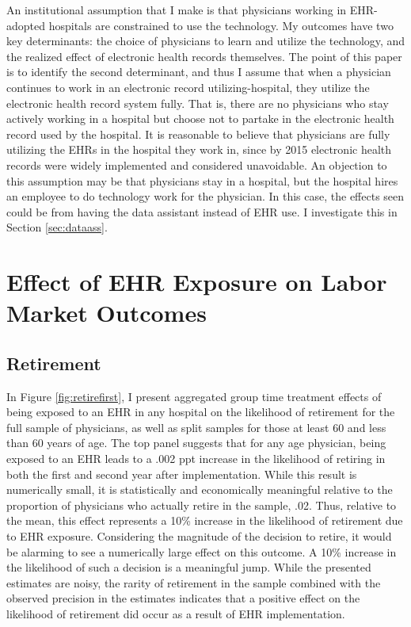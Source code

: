 \documentclass[11pt]{article}
\begin{document}
An institutional assumption that I make is that physicians working in EHR-adopted hospitals are constrained to use the technology. My outcomes have two key determinants: the choice of physicians to learn and utilize the technology, and the realized effect of electronic health records themselves. The point of this paper is to identify the second determinant, and thus I assume that when a physician continues to work in an electronic record utilizing-hospital, they utilize the electronic health record system fully. That is, there are no physicians who stay actively working in a hospital but choose not to partake in the electronic health record used by the hospital. It is reasonable to believe that physicians are fully utilizing the EHRs in the hospital they work in, since by 2015 electronic health records were widely implemented and considered unavoidable. An objection to this assumption may be that physicians stay in a hospital, but the hospital hires an employee to do technology work for the physician. In this case, the effects seen could be from having the data assistant instead of EHR use. I investigate this in Section \ref{sec:dataass}.





\section{Effect of EHR Exposure on Labor Market Outcomes}

\subsection{Retirement}


In Figure \ref{fig:retirefirst}, I present aggregated group time treatment effects of being exposed to an EHR in any hospital on the likelihood of retirement for the full sample of physicians, as well as split samples for those at least 60 and less than 60 years of age. The top panel suggests that for any age physician, being exposed to an EHR leads to a .002 ppt increase in the likelihood of retiring in both the first and second year after implementation. While this result is numerically small, it is statistically and economically meaningful relative to the proportion of physicians who actually retire in the sample, .02. Thus, relative to the mean, this effect represents a 10\% increase in the likelihood of retirement due to EHR exposure. Considering the magnitude of the decision to retire, it would be alarming to see a numerically large effect on this outcome. A 10\% increase in the likelihood of such a decision is a meaningful jump. While the presented estimates are noisy, the rarity of retirement in the sample combined with the observed precision in the estimates indicates that a positive effect on the likelihood of retirement did occur as a result of EHR implementation.
\end{document}
